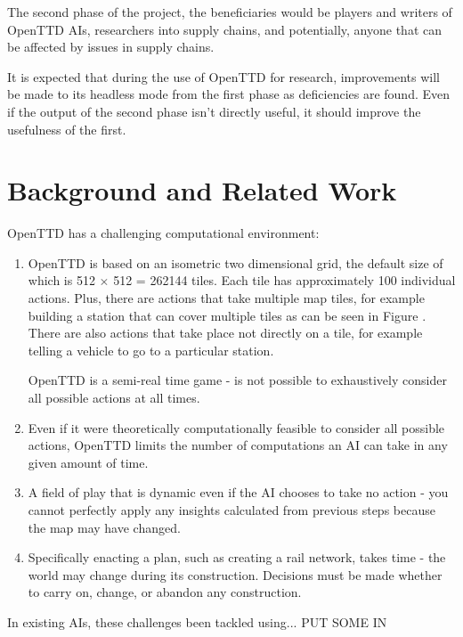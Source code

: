 \documentclass[a4paper,11pt]{article}
\begin{document}
The second phase of the project, the beneficiaries would be players and writers of OpenTTD AIs, researchers into supply chains, and potentially, anyone that can be affected by issues in supply chains.

It is expected that during the use of OpenTTD for research, improvements will be made to its headless mode from the first phase as deficiencies are found. Even if the output of the second phase isn't directly useful, it should improve the usefulness of the first.

\section{Background and Related Work}

OpenTTD has a challenging computational environment:

\begin{enumerate}

\item OpenTTD is based on an isometric two dimensional grid, the default size of which is 512 $\times$ 512 = 262144 tiles. Each tile has approximately 100 individual actions. Plus, there are actions that take multiple map tiles, for example building a station that can cover multiple tiles as can be seen in Figure \label{fig:network}. There are also actions that take place not directly on a tile, for example telling a vehicle to go to a particular station.

OpenTTD is a semi-real time game - is not possible to exhaustively consider all possible actions at all times.

\item Even if it were theoretically computationally feasible to consider all possible actions, OpenTTD limits the number of computations an AI can take in any given amount of time.

\item A field of play that is dynamic even if the AI chooses to take no action - you cannot perfectly apply any insights calculated from previous steps because the map may have changed.

\item Specifically enacting a plan, such as creating a rail network, takes time - the world may change during its construction. Decisions must be made whether to carry on, change, or abandon any construction.

\end{enumerate}

In existing AIs, these challenges been tackled using... PUT SOME IN
\end{document}
